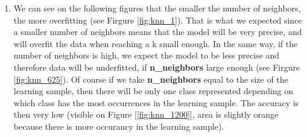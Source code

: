 \documentclass[acmconf,nonacm=true]{acmart}
\begin{document}
\begin{enumerate}
\begin{enumerate}
        \item 
        We can see on the following figures that the smaller the number of neighbors, the more overfitting (see Firgure \ref{fig:knn_1}). That is what we expected since a smaller number of neighbors means that the model will be very precise, and will overfit the data when reaching a k small enough. In the same way, if the number of neighbors is high, we expect the model to be less precise and therefore data will be underfitted, if \textbf{n\_neighbors} large enough (see Firgure \ref{fig:knn_625}). Of course if we take \textbf{n\_neighbors} equal to the size of the learning sample, then there will be only one class represented depending on which class has the most occurrences in the learning sample. The accuracy is then very low (visible on Figure [\ref{fig:knn_1200}], area is slightly orange because there is more occurancy in the learning sample).

\end{enumerate}
\end{enumerate}
\end{document}
